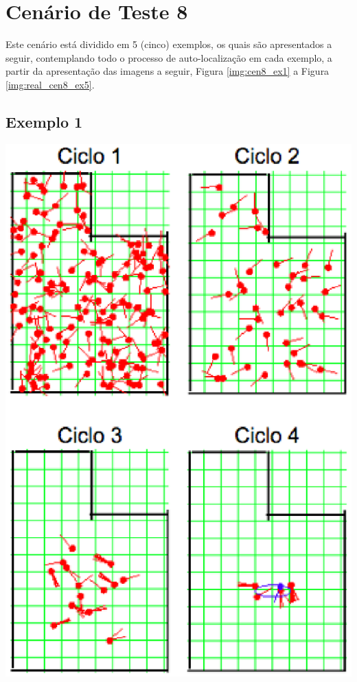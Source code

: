 \section{Cenário de Teste 8}
\label{sec:cenario6}

Este cenário está dividido em 5 (cinco) exemplos, os quais são apresentados a seguir, contemplando todo o processo de auto-localização
em cada exemplo, a partir da apresentação das imagens a seguir, Figura \ref{img:cen8_ex1} a Figura \ref{img:real_cen8_ex5}.

\subsection{Exemplo 1}

{\centering
\includegraphics[scale=0.4]{figuras/cen8_ex1.eps}
\label{img:cen8_ex1}
\par}

